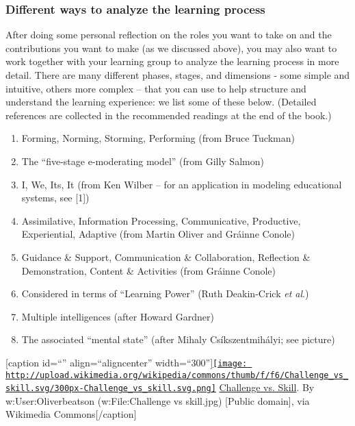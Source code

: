 \subsubsection{Different ways to analyze the learning process}

After doing some personal reflection on the roles you want to take on
and the contributions you want to make (as we discussed above), you may
also want to work together with your learning group to analyze the
learning process in more detail. There are many different phases,
stages, and dimensions - some simple and intuitive, others more complex
-- that you can use to help structure and understand the learning
experience: we list some of these below. (Detailed references are
collected in the recommended readings at the end of the book.)

\begin{enumerate}
\itemsep1pt\parskip0pt
\item
  Forming, Norming, Storming, Performing (from Bruce Tuckman)
\item
  The ``five-stage e-moderating model'' (from Gilly Salmon)
\item
  I, We, Its, It (from Ken Wilber -- for an application in modeling
  educational systems, see {[}1{]})
\item
  Assimilative, Information Processing, Communicative, Productive,
  Experiential, Adaptive (from Martin Oliver and Gráinne Conole)
\item
  Guidance \& Support, Communication \& Collaboration, Reflection \&
  Demonstration, Content \& Activities (from Gráinne Conole)
\item
  Considered in terms of ``Learning Power'' (Ruth Deakin-Crick \emph{et
  al}.)
\item
  Multiple intelligences (after Howard Gardner)
\item
  The associated ``mental state'' (after Mihaly Csíkszentmihályi; see
  picture)
\end{enumerate}

{[}caption id=``'' align=``aligncenter''
width=``300''{]}\href{http://commons.wikimedia.org/wiki/File\%3AChallenge_vs_skill.svg}{\texttt{[image: http://upload.wikimedia.org/wikipedia/commons/thumb/f/f6/Challenge\_vs\_skill.svg/300px-Challenge\_vs\_skill.svg.png]}}
\href{http://commons.wikimedia.org/wiki/File\%3AChallenge_vs_skill.svg}{Challenge
vs. Skill}. By w:User:Oliverbeatson (w:File:Challenge vs skill.jpg)
{[}Public domain{]}, via Wikimedia Commons{[}/caption{]}

